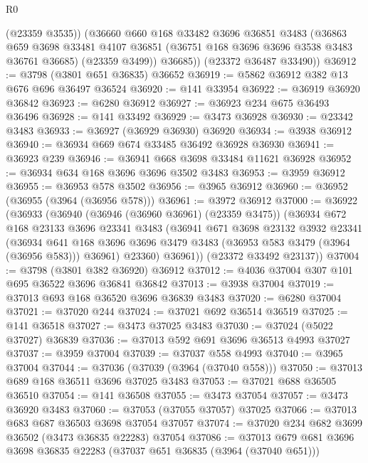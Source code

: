 \begin{lexlean}{R0}
\begin{coremodule}
          (@23359 @3535))
        (@36660
          @660
          @168
          @33482
          @3696
          @36851
          @3483
          (@36863
            @659
            @3698
            @33481
            @4107
            @36851
            (@36751 @168 @3696 @3696 @3538 @3483 @36761 @36685)
            (@23359 @3499))
          @36685))
      (@23372 @36487 @33490))
@36912 := @3798 (@3801 @651 @36835) @36652
@36919 := @5862 @36912 @382 @13 @676 @696 @36497 @36524
@36920 := @141 @33954
@36922 := @36919 @36920 @36842
@36923 := @6280 @36912
@36927 := @36923 @234 @675 @36493 @36496
@36928 := @141 @33492
@36929 := @3473 @36928
@36930 := @23342 @3483
@36933 := @36927 (@36929 @36930) @36920
@36934 := @3938 @36912
@36940 := @36934 @669 @674 @33485 @36492 @36928 @36930
@36941 := @36923 @239
@36946 := @36941 @668 @3698 @33484 @11621 @36928
@36952 := @36934 @634 @168 @3696 @3696 @3502 @3483
@36953 := @3959 @36912
@36955 := @36953 @578 @3502
@36956 := @3965 @36912
@36960 := @36952 (@36955 (@3964 (@36956 @578)))
@36961 := @3972 @36912
@37000 := @36922
    (@36933
      (@36940
        (@36946 (@36960 @36961) (@23359 @3475))
        (@36934
          @672
          @168
          @23133
          @3696
          @23341
          @3483
          (@36941
            @671
            @3698
            @23132
            @3932
            @23341
            (@36934
              @641
              @168
              @3696
              @3696
              @3479
              @3483
              (@36953 @583 @3479 (@3964 (@36956 @583)))
              @36961)
            @23360)
          @36961))
      (@23372 @33492 @23137))
@37004 := @3798 (@3801 @382 @36920) @36912
@37012 := @4036 @37004 @307 @101 @695 @36522 @3696 @36841 @36842
@37013 := @3938 @37004
@37019 := @37013 @693 @168 @36520 @3696 @36839 @3483
@37020 := @6280 @37004
@37021 := @37020 @244
@37024 := @37021 @692 @36514 @36519
@37025 := @141 @36518
@37027 := @3473 @37025 @3483
@37030 := @37024 (@5022 @37027) @36839
@37036 := @37013 @592 @691 @3696 @36513 @4993 @37027
@37037 := @3959 @37004
@37039 := @37037 @558 @4993
@37040 := @3965 @37004
@37044 := @37036 (@37039 (@3964 (@37040 @558)))
@37050 := @37013 @689 @168 @36511 @3696 @37025 @3483
@37053 := @37021 @688 @36505 @36510
@37054 := @141 @36508
@37055 := @3473 @37054
@37057 := @3473 @36920 @3483
@37060 := @37053 (@37055 @37057) @37025
@37066 := @37013 @683 @687 @36503 @3698 @37054 @37057
@37074 := @37020 @234 @682 @3699 @36502 (@3473 @36835 @22283) @37054
@37086 := @37013 @679 @681 @3696 @3698 @36835 @22283 (@37037 @651 @36835 (@3964 (@37040 @651)))

\end{coremodule}
\end{lexlean}
